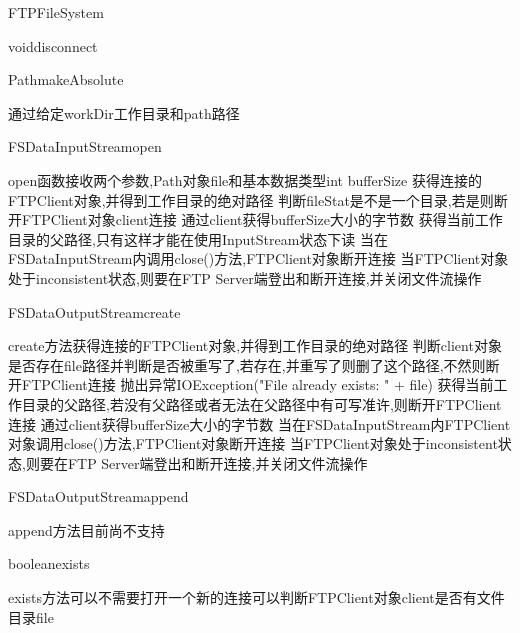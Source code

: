 \begin{XeClass}{FTPFileSystem}
\begin{XeMethod}{\XePrivate}{void}{disconnect}
    \end{XeMethod}

    \begin{XeMethod}{\XePrivate}{Path}{makeAbsolute}
         
 通过给定workDir工作目录和path路径

    \end{XeMethod}

    \begin{XeMethod}{\XePublic}{FSDataInputStream}{open}
         
 open函数接收两个参数,Path对象file和基本数据类型int bufferSize
 获得连接的FTPClient对象,并得到工作目录的绝对路径
 判断fileStat是不是一个目录,若是则断开FTPClient对象client连接
 通过client获得bufferSize大小的字节数
 获得当前工作目录的父路径,只有这样才能在使用InputStream状态下读
 当在FSDataInputStream内调用close()方法,FTPClient对象断开连接
 当FTPClient对象处于inconsistent状态,则要在FTP Server端登出和断开连接,并关闭文件流操作

    \end{XeMethod}

    \begin{XeMethod}{\XePublic}{FSDataOutputStream}{create}
         
 create方法获得连接的FTPClient对象,并得到工作目录的绝对路径
 判断client对象是否存在file路径并判断是否被重写了,若存在,并重写了则删了这个路径,不然则断开FTPClient连接
 抛出异常IOException("File already exists: " + file)
 获得当前工作目录的父路径,若没有父路径或者无法在父路径中有可写准许,则断开FTPClient连接
 通过client获得bufferSize大小的字节数
 当在FSDataInputStream内FTPClient对象调用close()方法,FTPClient对象断开连接
 当FTPClient对象处于inconsistent状态,则要在FTP Server端登出和断开连接,并关闭文件流操作

    \end{XeMethod}

    \begin{XeMethod}{\XePublic}{FSDataOutputStream}{append}
         
 append方法目前尚不支持 

    \end{XeMethod}

    \begin{XeMethod}{\XePrivate}{boolean}{exists}
         
 exists方法可以不需要打开一个新的连接可以判断FTPClient对象client是否有文件目录file

    \end{XeMethod}


\end{XeClass}
